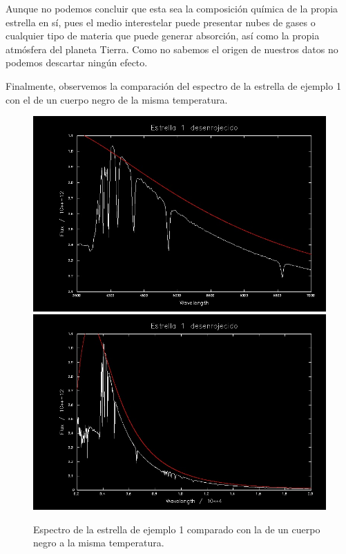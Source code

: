 \documentclass{aa} %
\begin{document}
Aunque no podemos concluir que esta sea la composición química de la propia estrella en sí, pues el medio interestelar puede presentar nubes de gases o cualquier tipo de materia que puede generar absorción, así como la propia atmósfera del planeta Tierra. Como no sabemos el origen de nuestros datos no podemos descartar ningún efecto.

Finalmente, observemos la comparación del espectro de la estrella de ejemplo 1 con el de un cuerpo negro de la misma temperatura.

\begin{figure}[h!]
\begin{center}
\includegraphics[scale=0.15]{1 bbody.png}
\includegraphics[scale=0.15]{1 bigger.png}
\caption{Espectro de la estrella de ejemplo 1 comparado con la de un cuerpo negro a la misma temperatura.}
\end{center}
\end{figure}
\end{document}
